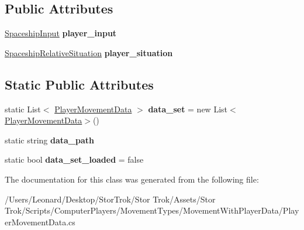 \subsection*{Public Attributes}
\begin{DoxyCompactItemize}
\item 
\mbox{\label{class_player_movement_data_a8ffd04d401c12c78b4f0faae28d4c7a1}} 
\hyperlink{struct_spaceship_input}{Spaceship\+Input} {\bfseries player\+\_\+input}
\item 
\mbox{\label{class_player_movement_data_a81065ba299bbe187ec345b043f91c2ac}} 
\hyperlink{struct_spaceship_relative_situation}{Spaceship\+Relative\+Situation} {\bfseries player\+\_\+situation}
\end{DoxyCompactItemize}
\subsection*{Static Public Attributes}
\begin{DoxyCompactItemize}
\item 
\mbox{\label{class_player_movement_data_a98f5de3bbb2a48db0d93b482795adb19}} 
static List$<$ \hyperlink{class_player_movement_data}{Player\+Movement\+Data} $>$ {\bfseries data\+\_\+set} = new List$<$\hyperlink{class_player_movement_data}{Player\+Movement\+Data}$>$()
\item 
\mbox{\label{class_player_movement_data_a883aa9f57c92034fc7e6d3035c3b5594}} 
static string {\bfseries data\+\_\+path}
\item 
\mbox{\label{class_player_movement_data_a5cb0febb79c8e131ccd5ce220706f69c}} 
static bool {\bfseries data\+\_\+set\+\_\+loaded} = false
\end{DoxyCompactItemize}


The documentation for this class was generated from the following file\+:\begin{DoxyCompactItemize}
\item 
/\+Users/\+Leonard/\+Desktop/\+Stor\+Trok/\+Stor Trok/\+Assets/\+Stor Trok/\+Scripts/\+Computer\+Players/\+Movement\+Types/\+Movement\+With\+Player\+Data/Player\+Movement\+Data.\+cs\end{DoxyCompactItemize}
